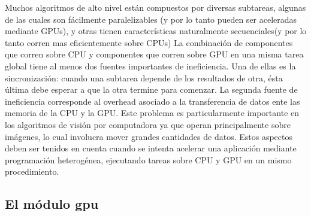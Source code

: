 \documentclass[a4paper,10pt]{report}
\begin{document}
Muchos algoritmos de alto nivel están compuestos por diversas subtareas, algunas de las cuales son fácilmente paralelizables (y por lo tanto pueden ser aceleradas mediante GPUs), 
y otras tienen características naturalmente secuenciales(y por lo tanto corren mas eficientemente sobre CPUs)
La combinación de componentes que corren sobre CPU y componentes que corren sobre GPU en una misma tarea global tiene al menos dos fuentes importantes de ineficiencia.
Una de ellas es la sincronización: cuando una subtarea depende de los resultados de otra, ésta última debe esperar a que la otra termine para comenzar.
La segunda fuente de ineficiencia corresponde al overhead asociado a la transferencia de datos ente las memoria de la CPU y la GPU. Este problema es particularmente importante en los algoritmos de visión por computadora ya que
operan principalmente sobre imágenes, lo cual involucra mover grandes cantidades de datos.
Estos aspectos deben ser tenidos en cuenta cuando se intenta acelerar una aplicación mediante programación heterogénea, ejecutando tareas sobre CPU y GPU en un mismo procedimiento.














\subsection{El módulo gpu}




% 
% 
% 
% 
% 
\end{document}
